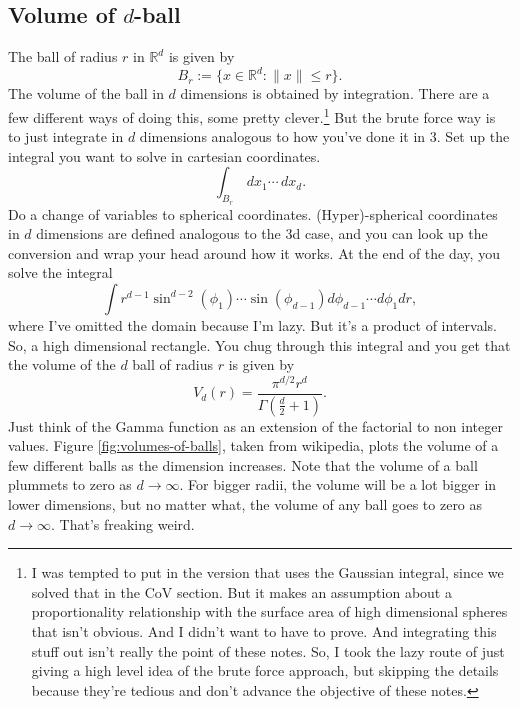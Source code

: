 \documentclass{book}
\newcommand{\dx}{\, dx}
\newcommand{\R}{\mathbb{R}}
\begin{document}
\subsection{Volume of $d$-ball}
The ball of radius $r$ in $\R^d$ is given by
$$
B_r := \{ x\in \R^d: \|x\| \leq r\}.
$$
The volume of the ball in $d$ dimensions is obtained by integration. There are a few different ways of doing this, some pretty clever.\footnote{I was tempted to put in the version that uses the Gaussian integral, since we solved that in the CoV section. But it makes an assumption about a proportionality relationship with the surface area of high dimensional spheres that isn't obvious. And I didn't want to have to prove. And integrating this stuff out isn't really the point of these notes. So, I took the lazy route of just giving a high level idea of the brute force approach, but skipping the details because they're tedious and don't advance the objective of these notes.} But the brute force way is to just integrate in $d$ dimensions analogous to how you've done it in 3. Set up the integral you want to solve in cartesian coordinates.
$$
\int_{B_r} \dx_1\cdots \dx_d.
$$
Do a change of variables to spherical coordinates. (Hyper)-spherical coordinates in $d$ dimensions are defined analogous to the 3d case, and you can look up the conversion and wrap your head around how it works. At the end of the day, you solve the integral
$$
\int r^{d-1} \sin^{d-2}(\phi_1)\cdots\sin(\phi_{d-1}) d\phi_{d-1}\cdots d\phi_{1} dr,
$$
where I've omitted the domain because I'm lazy. But it's a product of intervals. So, a high dimensional rectangle. You chug through this integral and you get that the volume of the $d$ ball of radius $r$ is given by
\begin{equation} \label{eq:vol-of-ball}
V_d(r) = \frac{\pi^{d/2}r^d}{\Gamma(\frac{d}{2} + 1)}. 
\end{equation}
Just think of the Gamma function as an extension of the factorial to non integer values. 
Figure \ref{fig:volumes-of-balls}, taken from wikipedia, plots the volume of a few different balls as the dimension increases. Note that the volume of a ball plummets to zero as $d\to\infty$. For bigger radii, the volume will be a lot bigger in lower dimensions, but no matter what, the volume of any ball goes to zero as $d\to \infty$. That's freaking weird. 
\end{document}
